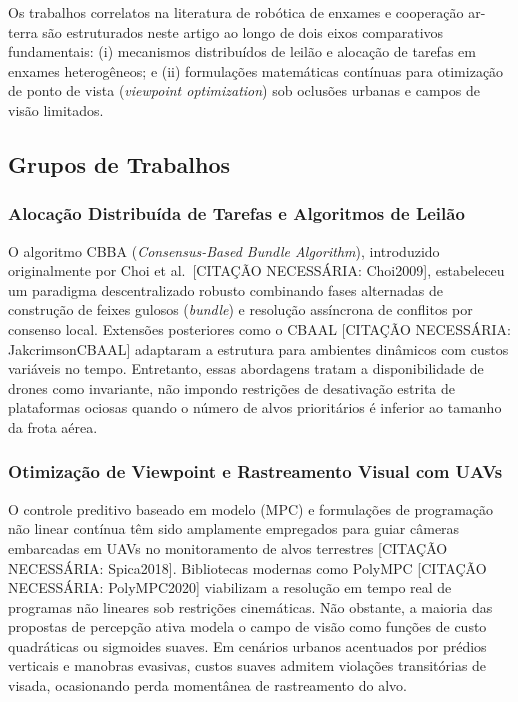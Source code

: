 \documentclass[
  brazilian,
  a4paper]{article}
\begin{document}
Os trabalhos correlatos na literatura de robótica de enxames e
cooperação ar-terra são estruturados neste artigo ao longo de dois eixos
comparativos fundamentais: (i) mecanismos distribuídos de leilão e
alocação de tarefas em enxames heterogêneos; e (ii) formulações
matemáticas contínuas para otimização de ponto de vista (\emph{viewpoint
optimization}) sob oclusões urbanas e campos de visão limitados.

\subsection{Grupos de Trabalhos}\label{grupos-de-trabalhos}

\subsubsection{Alocação Distribuída de Tarefas e Algoritmos de
Leilão}\label{alocauxe7uxe3o-distribuuxedda-de-tarefas-e-algoritmos-de-leiluxe3o}

O algoritmo CBBA (\emph{Consensus-Based Bundle Algorithm}), introduzido
originalmente por Choi et al.~{[}CITAÇÃO NECESSÁRIA: Choi2009{]},
estabeleceu um paradigma descentralizado robusto combinando fases
alternadas de construção de feixes gulosos (\emph{bundle}) e resolução
assíncrona de conflitos por consenso local. Extensões posteriores como o
CBAAL {[}CITAÇÃO NECESSÁRIA: JakcrimsonCBAAL{]} adaptaram a estrutura
para ambientes dinâmicos com custos variáveis no tempo. Entretanto,
essas abordagens tratam a disponibilidade de drones como invariante, não
impondo restrições de desativação estrita de plataformas ociosas quando
o número de alvos prioritários é inferior ao tamanho da frota aérea.

\subsubsection{Otimização de Viewpoint e Rastreamento Visual com
UAVs}\label{otimizauxe7uxe3o-de-viewpoint-e-rastreamento-visual-com-uavs}

O controle preditivo baseado em modelo (MPC) e formulações de
programação não linear contínua têm sido amplamente empregados para
guiar câmeras embarcadas em UAVs no monitoramento de alvos terrestres
{[}CITAÇÃO NECESSÁRIA: Spica2018{]}. Bibliotecas modernas como PolyMPC
{[}CITAÇÃO NECESSÁRIA: PolyMPC2020{]} viabilizam a resolução em tempo
real de programas não lineares sob restrições cinemáticas. Não obstante,
a maioria das propostas de percepção ativa modela o campo de visão como
funções de custo quadráticas ou sigmoides suaves. Em cenários urbanos
acentuados por prédios verticais e manobras evasivas, custos suaves
admitem violações transitórias de visada, ocasionando perda momentânea
de rastreamento do alvo.
\end{document}
